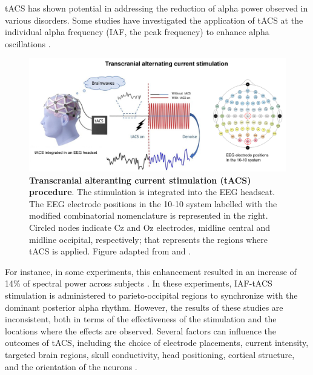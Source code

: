 \documentclass[../main.tex]{subfiles}
\begin{document}
tACS has shown potential in addressing the reduction of alpha power observed in various disorders.
Some studies have investigated the application of tACS at the individual alpha frequency (IAF, the peak frequency) to enhance alpha oscillations \citep{zaehle_transcranial_2010, helfrich2014entrainment, kasten2019integrating, zarubin_transient_2020}.
\begin{figure}[!htb]
    \centering
\includegraphics[width=\textwidth]{chapter3/figures/tacs_schematics.png}
    \caption{\textbf{Transcranial alteranting current stimulation (tACS) procedure}.
    The stimulation is integrated into the EEG headseat.
    The EEG electrode positions in the 10-10 system labelled with the modified combinatorial nomenclature is represented in the right. 
    Circled nodes indicate Cz and Oz electrodes, midline central and midline occipital, respectively; that represents the regions where tACS is applied.
    Figure adapted from \citep{9743292} and \citep{EEGlabels}.}
    \label{fig:EEG}
\end{figure}
For instance, in some experiments, this enhancement resulted in an increase of 14\% of spectral power across subjects \citep{zaehle_transcranial_2010}.
In these experiments, IAF-tACS stimulation is administered to parieto-occipital regions to synchronize with the dominant posterior alpha rhythm.
However, the results of these studies are inconsistent, both in terms of the effectiveness of the stimulation and the locations where the effects are observed.
Several factors can influence the outcomes of tACS, including the choice of electrode placements, current intensity, targeted brain regions, skull conductivity, head positioning, cortical structure, and the orientation of the neurons \citep{datta2012inter,guerra2020variability,huang2018roast,kasten_integrating_2019}.
\end{document}
